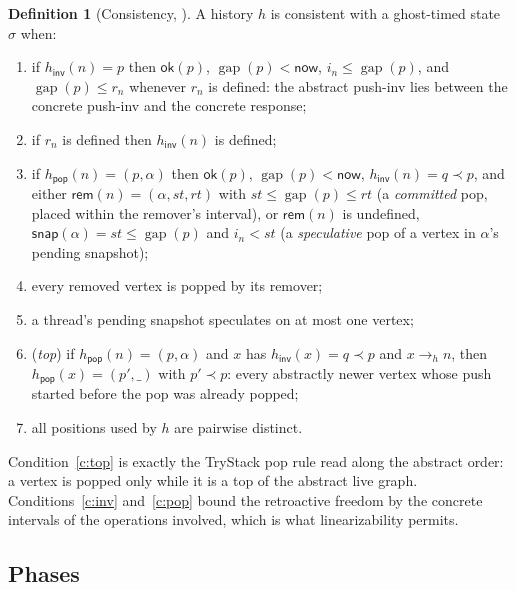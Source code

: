 \documentclass[11pt]{article}
\theoremstyle{definition}
\newtheorem{definition}[lemma]{Definition}
\theoremstyle{remark}
\newcommand{\gap}{\mathop{\mathrm{gap}}}
\newcommand{\conc}{\sigma}
\newcommand{\code}[1]{\texttt{\detokenize{#1}}}
\newcommand{\now}{\mathsf{now}}
\newcommand{\rem}{\mathsf{rem}}
\newcommand{\snap}{\mathsf{snap}}
\newcommand{\lt}{\prec}
\newcommand{\pop}{\mathsf{pop}}
\newcommand{\inv}{\mathsf{inv}}
\begin{document}
\begin{definition}[Consistency, \code{consistent}]\label{def:consistent}
A history \(h\) is consistent with a ghost-timed state \(\conc\) when:
\begin{enumerate}[nosep,label=(C\arabic*)]
\item\label{c:inv} if \(h_\inv(n)=p\) then \(\mathsf{ok}(p)\), \(\gap(p)<\now\),
  \(i_n\le\gap(p)\), and \(\gap(p)\le r_n\) whenever \(r_n\) is defined:
  the abstract push-inv lies between the concrete push-inv and the concrete
  response;
\item\label{c:ret} if \(r_n\) is defined then \(h_\inv(n)\) is defined;
\item\label{c:pop} if \(h_\pop(n)=(p,\alpha)\) then \(\mathsf{ok}(p)\),
  \(\gap(p)<\now\), \(h_\inv(n)=q\lt p\), and either
  \(\rem(n)=(\alpha,st,rt)\) with \(st\le\gap(p)\le rt\)
  (a \emph{committed} pop, placed within the remover's interval), or
  \(\rem(n)\) is undefined, \(\snap(\alpha)=st\le\gap(p)\) and \(i_n<st\)
  (a \emph{speculative} pop of a vertex in \(\alpha\)'s pending snapshot);
\item\label{c:remp} every removed vertex is popped by its remover;
\item\label{c:spec} a thread's pending snapshot speculates on at most one
  vertex;
\item\label{c:top} (\emph{top}) if \(h_\pop(n)=(p,\alpha)\) and \(x\) has
  \(h_\inv(x)=q\lt p\) and \(x\to_h n\), then \(h_\pop(x)=(p',\_)\) with
  \(p'\lt p\): every abstractly newer vertex whose push started before the
  pop was already popped;
\item\label{c:uniq} all positions used by \(h\) are pairwise distinct.
\end{enumerate}
\end{definition}

Condition~\ref{c:top} is exactly the TryStack pop rule read along the
abstract order: a vertex is popped only while it is a top of the abstract
live graph.  Conditions~\ref{c:inv} and~\ref{c:pop} bound the retroactive
freedom by the concrete intervals of the operations involved, which is what
linearizability permits.

\subsection{Phases}
\end{document}
